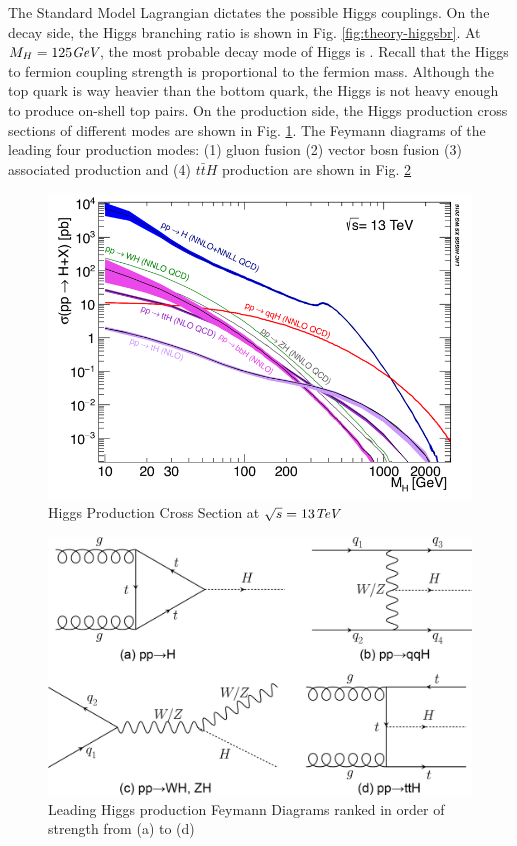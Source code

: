 The Standard Model Lagrangian dictates the possible Higgs couplings. On the decay side, the Higgs branching ratio is shown in Fig. \ref{fig:theory-higgsbr}. At $M_H = 125\textit{GeV}$, the most probable decay mode of Higgs is \Hbb. Recall that the Higgs to fermion coupling strength is proportional to the fermion mass. Although the top quark is way heavier than the bottom quark, the Higgs is not heavy enough to produce on-shell top pairs. On the production side, the Higgs production cross sections of different modes are shown in Fig. \ref{fig:theory-higgsp}. The Feymann diagrams of the leading four production modes: (1) gluon fusion (2) vector bosn fusion (3) associated production and (4) $t\bar{t} H$ production are shown in Fig. \ref{fig:theory-higgsfeymann}


\begin{figure}[htpb!]
\begin{center}
  \includegraphics[width=0.6\linewidth]{figures/theory/HiggsCrossSection.png}
\caption{Higgs Production Cross Section at $\sqrt{s}= 13\textit{TeV}$}
\label{fig:theory-higgsp}
\end{center}
\end{figure}

\begin{figure}[htpb!]
\begin{center}
  \includegraphics[width=0.45\linewidth]{figures/theory/ProductionFeymann}
\caption{Leading Higgs production Feymann Diagrams ranked in order of strength from (a) to (d)}
\label{fig:theory-higgsfeymann}
\end{center}
\end{figure}


